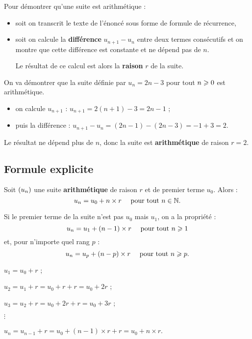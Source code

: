 \documentclass[a4paper,11pt]{article}
\begin{document}
\begin{cmethode}
Pour démontrer qu'une suite est arithmétique :
\begin{itemize}
	\item soit on transcrit le texte de l'énoncé sous forme de formule de récurrence,
	\item soit on calcule la \textbf{différence} $u_{n+1}-u_n$ entre deux termes consécutifs et on montre que cette différence est constante et ne dépend pas de $n$.
	
	Le résultat de ce calcul est alors la \textbf{raison} $r$ de la suite.
\end{itemize}
\end{cmethode}

\begin{cexemple}
On va démontrer que la suite définie par $u_n=2n-3$ pour tout $n \geqslant 0$ est arithmétique.
\begin{itemize}
	\item on calcule $u_{n+1}$ : $u_{n+1}=2(n+1)-3=2n-1$ ;
	\item puis la différence : $u_{n+1}-u_n=(2n-1)-(2n-3)=-1+3=2$.
\end{itemize}
Le résultat ne dépend plus de $n$, donc la suite est \textbf{arithmétique} de raison $r=2$.
\end{cexemple}

\subsection{Formule explicite}

\begin{cprop}
Soit $\left( u_n \right)$ une suite \textbf{arithmétique} de raison $r$ et de premier terme $u_0$. Alors : \[u_n=u_0+n\times r \quad  \text{ pour tout } n \in \N.\]
\end{cprop}

\begin{crmq}
Si le premier terme de la suite n'est pas $u_0$ mais $u_1$, on a la propriété : \[u_n=u_1+(n-1) \times r \quad \text{ pour tout }n \geqslant 1 \]%
et, pour n'importe quel rang $p$ : \[u_n=u_p+(n-p) \times r \quad \text{ pour tout } n \geqslant p.\]
\end{crmq}

\begin{cdemo}
$u_1=u_0+r$ ;

$u_2=u_1+r=u_0+r+r=u_0+2r$ ;

$u_3=u_2+r=u_0+2r+r=u_0+3r$ ;

$\vdots$

$u_n=u_{n-1}+r=u_0+(n-1) \times r +r = u_0 + n\times r$.
\end{cdemo}
\end{document}
